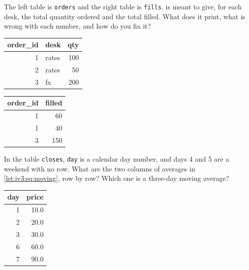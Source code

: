 \begin{question}\label{iq:iv3:sql-and-data:10}
The left table is \texttt{orders} and the right table is \texttt{fills}.  is meant to give, for each desk, the total quantity ordered and the total filled. What does it print, what is wrong with each number, and how do you fix it?
\begin{center}\small
\begin{tabular}{rlr}
order\_id & desk & qty\\\hline
1 & rates & 100\\
2 & rates & 50\\
3 & fx & 200
\end{tabular}\qquad
\begin{tabular}{rr}
order\_id & filled\\\hline
1 & 60\\
1 & 40\\
3 & 150
\end{tabular}
\end{center}
\label{lst:iv3:sq:fanout}
\end{question}

\begin{question}\label{iq:iv3:sql-and-data:11}
In the table \texttt{closes}, \texttt{day} is a calendar day number, and days 4 and 5 are a weekend with no row. What are the two columns of averages in \cref{lst:iv3:sq:moving}, row by row? Which one is a three-day moving average?
\begin{center}\small
\begin{tabular}{rr}
day & price\\\hline
1 & 10.0\\
2 & 20.0\\
3 & 30.0\\
6 & 60.0\\
7 & 90.0
\end{tabular}
\end{center}
\label{lst:iv3:sq:moving}
\end{question}

